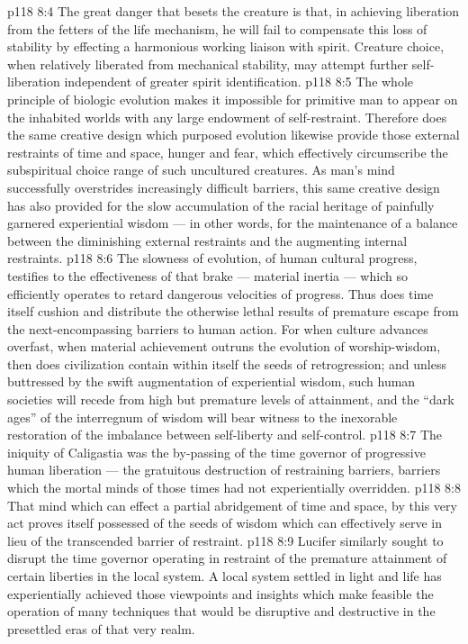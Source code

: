 \vs p118 8:4 The great danger that besets the creature is that, in achieving liberation from the fetters of the life mechanism, he will fail to compensate this loss of stability by effecting a harmonious working liaison with spirit. Creature choice, when relatively liberated from mechanical stability, may attempt further self\hyp{}liberation independent of greater spirit identification.
\vs p118 8:5 The whole principle of biologic evolution makes it impossible for primitive man to appear on the inhabited worlds with any large endowment of self\hyp{}restraint. Therefore does the same creative design which purposed evolution likewise provide those external restraints of time and space, hunger and fear, which effectively circumscribe the subspiritual choice range of such uncultured creatures. As man’s mind successfully overstrides increasingly difficult barriers, this same creative design has also provided for the slow accumulation of the racial heritage of painfully garnered experiential wisdom --- in other words, for the maintenance of a balance between the diminishing external restraints and the augmenting internal restraints.
\vs p118 8:6 The slowness of evolution, of human cultural progress, testifies to the effectiveness of that brake --- material inertia --- which so efficiently operates to retard dangerous velocities of progress. Thus does time itself cushion and distribute the otherwise lethal results of premature escape from the next\hyp{}encompassing barriers to human action. For when culture advances overfast, when material achievement outruns the evolution of worship\hyp{}wisdom, then does civilization contain within itself the seeds of retrogression; and unless buttressed by the swift augmentation of experiential wisdom, such human societies will recede from high but premature levels of attainment, and the “dark ages” of the interregnum of wisdom will bear witness to the inexorable restoration of the imbalance between self\hyp{}liberty and self\hyp{}control.
\vs p118 8:7 The iniquity of Caligastia was the by\hyp{}passing of the time governor of progressive human liberation --- the gratuitous destruction of restraining barriers, barriers which the mortal minds of those times had not experientially overridden.
\vs p118 8:8 That mind which can effect a partial abridgement of time and space, by this very act proves itself possessed of the seeds of wisdom which can effectively serve in lieu of the transcended barrier of restraint.
\vs p118 8:9 Lucifer similarly sought to disrupt the time governor operating in restraint of the premature attainment of certain liberties in the local system. A local system settled in light and life has experientially achieved those viewpoints and insights which make feasible the operation of many techniques that would be disruptive and destructive in the presettled eras of that very realm.
